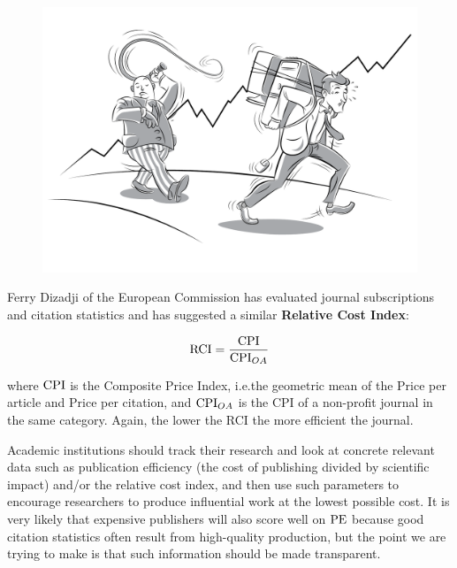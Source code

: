 \documentclass[graybox,envcountchap,sectrefs,UStrade]{svmono}
\begin{document}
\begin{figure}[!htb]
\begin{center}
  \includegraphics[width=.85\textwidth]{Fig_performance_is_everything.pdf}
\label{Fig:performance_is_everything}
\end{center}
\end{figure}

Ferry Dizadji of the European Commission has evaluated journal subscriptions and citation statistics and has suggested a similar \textbf{Relative Cost Index}:

\begin{equation}\label{E:info.production}
    {\rm RCI} = \frac{{\rm CPI}}{{\rm CPI}_{OA}}
\end{equation}

\noindent where $\rm CPI$ is the Composite Price Index, i.e.\@ the geometric mean of the Price per article and Price per citation, and ${\rm CPI}_{OA}$ is the CPI of a non-profit journal in the same category. Again, the lower the RCI the more efficient the journal. \par

Academic institutions should track their research and look at concrete relevant data such as publication efficiency (the cost of publishing divided by scientific impact) and/or the relative cost index, and then use such parameters to encourage researchers to produce influential work at the lowest possible cost. It is very likely that expensive publishers will also score well on ${\rm PE}$ because good citation statistics often result from high-quality production, but the point we are trying to make is that such information should be made transparent. \par
\end{document}
